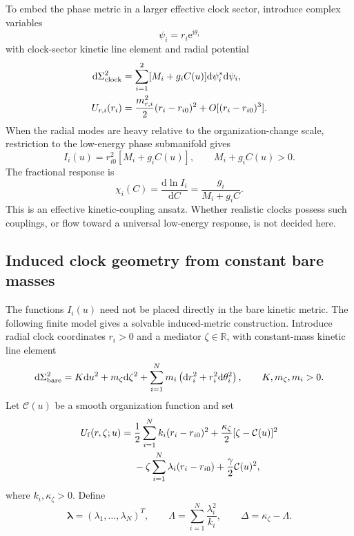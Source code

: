 \documentclass[11pt]{article}
\theoremstyle{plain}
\newcommand{\dd}{\mathrm d}
\newcommand{\e}{\mathrm e}
\begin{document}
To embed the phase metric in a larger effective clock sector, introduce complex variables
\begin{equation}
\psi_i=r_i\e^{\mathrm i\theta_i}
\end{equation}
with clock-sector kinetic line element and radial potential
\begin{align}
\dd\Sigma_{\rm clock}^2&=\sum_{i=1}^2[M_i+g_iC(u)]\dd\psi_i^*\dd\psi_i,\\
U_{r,i}(r_i)&=\frac{m_{r,i}^2}{2}(r_i-r_{i0})^2+O[(r_i-r_{i0})^3].
\end{align}
When the radial modes are heavy relative to the organization-change scale, restriction to the low-energy phase submanifold gives
\begin{equation}
I_i(u)=r_{i0}^2[M_i+g_iC(u)],\qquad M_i+g_iC(u)>0.
\end{equation}
The fractional response is
\begin{equation}
\chi_i(C)=\frac{\dd\ln I_i}{\dd C}=\frac{g_i}{M_i+g_iC}.
\end{equation}
This is an effective kinetic-coupling ansatz. Whether realistic clocks possess such couplings, or flow toward a universal low-energy response, is not decided here.

\subsection{Induced clock geometry from constant bare masses}

The functions $I_i(u)$ need not be placed directly in the bare kinetic
metric.  The following finite model gives a solvable induced-metric
construction.  Introduce radial clock coordinates $r_i>0$ and a mediator
$\zeta\in\mathbb R$, with constant-mass kinetic line element
\begin{equation}
 \dd\Sigma_{\rm bare}^2
 =K\dd u^2+m_\zeta\dd\zeta^2
 +\sum_{i=1}^{N}m_i
 \left(\dd r_i^2+r_i^2\dd\theta_i^2\right),
 \qquad K,m_\zeta,m_i>0.
 \label{eq:baremetric}
\end{equation}
Let $\mathcal C(u)$ be a smooth organization function and set
\begin{align}
 U_{\rm f}(r,\zeta;u)
 ={}&\frac12\sum_{i=1}^{N}k_i(r_i-r_{i0})^2
 +\frac{\kappa_\zeta}{2}[\zeta-\mathcal C(u)]^2
 \nonumber\\
 &-\zeta\sum_{i=1}^{N}\lambda_i(r_i-r_{i0})
 +\frac{\gamma}{2}\mathcal C(u)^2,
 \label{eq:fastpotential}
\end{align}
where $k_i,\kappa_\zeta>0$.  Define
\begin{equation}
 \boldsymbol\lambda=(\lambda_1,\ldots,\lambda_N)^T,
 \qquad
 \Lambda=\sum_{i=1}^{N}\frac{\lambda_i^2}{k_i},
 \qquad
 \Delta=\kappa_\zeta-\Lambda.
 \label{eq:fastdelta}
\end{equation}
\end{document}

